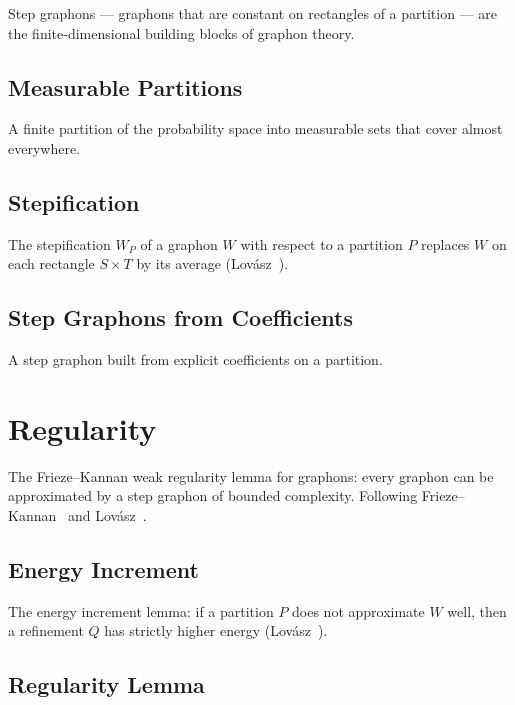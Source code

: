 Step graphons --- graphons that are constant on rectangles of a partition ---
are the finite-dimensional building blocks of graphon theory.

\section{Measurable Partitions}

A finite partition of the probability space into measurable sets that
cover almost everywhere.


\section{Stepification}

The stepification $W_P$ of a graphon $W$ with respect to a partition $P$
replaces $W$ on each rectangle $S \times T$ by its average
(Lov\'asz~\cite[Section~9.2]{lovasz2012}).


\section{Step Graphons from Coefficients}

A step graphon built from explicit coefficients on a partition.



\chapter{Regularity}

The Frieze--Kannan weak regularity lemma for graphons: every graphon can be
approximated by a step graphon of bounded complexity.
Following Frieze--Kannan~\cite{friezekannan1999} and
Lov\'asz~\cite[Corollary~9.13]{lovasz2012}.

\section{Energy Increment}

The energy increment lemma: if a partition $P$ does not approximate $W$ well,
then a refinement $Q$ has strictly higher energy
(Lov\'asz~\cite[Lemma~9.11]{lovasz2012}).


\section{Regularity Lemma}

